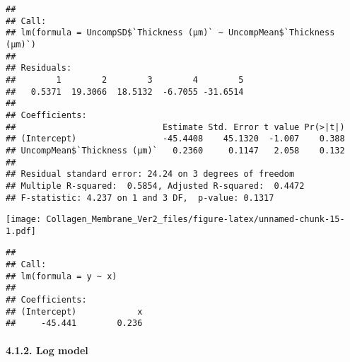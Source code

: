 \documentclass[
]{article}
\newenvironment{Shaded}{\begin{snugshade}}{\end{snugshade}}
\newcommand{\AttributeTok}[1]{\textcolor[rgb]{0.77,0.63,0.00}{#1}}
\newcommand{\ConstantTok}[1]{\textcolor[rgb]{0.00,0.00,0.00}{#1}}
\newcommand{\FunctionTok}[1]{\textcolor[rgb]{0.00,0.00,0.00}{#1}}
\newcommand{\NormalTok}[1]{#1}
\newcommand{\OtherTok}[1]{\textcolor[rgb]{0.56,0.35,0.01}{#1}}
\newcommand{\SpecialCharTok}[1]{\textcolor[rgb]{0.00,0.00,0.00}{#1}}
\newcommand{\StringTok}[1]{\textcolor[rgb]{0.31,0.60,0.02}{#1}}
\begin{document}
\begin{verbatim}
## 
## Call:
## lm(formula = UncompSD$`Thickness (μm)` ~ UncompMean$`Thickness (μm)`)
## 
## Residuals:
##        1        2        3        4        5 
##   0.5371  19.3066  18.5132  -6.7055 -31.6514 
## 
## Coefficients:
##                             Estimate Std. Error t value Pr(>|t|)
## (Intercept)                 -45.4408    45.1320  -1.007    0.388
## UncompMean$`Thickness (μm)`   0.2360     0.1147   2.058    0.132
## 
## Residual standard error: 24.24 on 3 degrees of freedom
## Multiple R-squared:  0.5854, Adjusted R-squared:  0.4472 
## F-statistic: 4.237 on 1 and 3 DF,  p-value: 0.1317
\end{verbatim}

\begin{Shaded}
\end{Shaded}

\texttt{[image: Collagen\_Membrane\_Ver2\_files/figure-latex/unnamed-chunk-15-1.pdf]}

\begin{verbatim}
## 
## Call:
## lm(formula = y ~ x)
## 
## Coefficients:
## (Intercept)            x  
##     -45.441        0.236
\end{verbatim}

\hypertarget{log-model}{%
\paragraph{4.1.2. Log model}\label{log-model}}

\begin{Shaded}
\end{Shaded}
\end{document}
